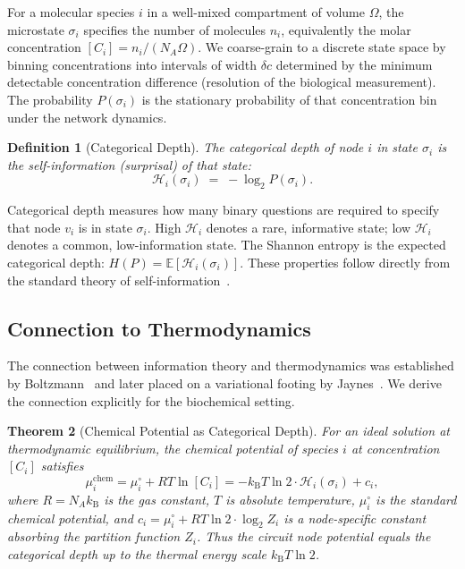 \documentclass[twocolumn,10pt,a4paper]{article}
\newcommand{\kB}{k_{\mathrm{B}}}
\newcommand{\Hcat}{\mathcal{H}}
\newtheorem{theorem}{Theorem}[section]
\newtheorem{definition}[theorem]{Definition}
\begin{document}
For a molecular species $i$ in a well-mixed compartment of volume $\Omega$,
the microstate $\sigma_i$ specifies the number of molecules $n_i$, equivalently
the molar concentration $[C_i]=n_i/(N_A\Omega)$.  We coarse-grain to a discrete
state space by binning concentrations into intervals of width $\delta c$
determined by the minimum detectable concentration difference (resolution of
the biological measurement).  The probability $P(\sigma_i)$ is the stationary
probability of that concentration bin under the network dynamics.

\begin{definition}[Categorical Depth]
\label{def:catdepth}
The \emph{categorical depth} of node $i$ in state $\sigma_i$ is the
self-information (surprisal) of that state:
\begin{equation}
  \Hcat_i(\sigma_i) \;=\; -\log_2 P(\sigma_i).
  \label{eq:catdepth}
\end{equation}
\end{definition}

Categorical depth measures how many binary questions are required to specify
that node $v_i$ is in state $\sigma_i$.  High $\Hcat_i$ denotes a rare,
informative state; low $\Hcat_i$ denotes a common, low-information state.
The Shannon entropy is the expected categorical depth:
$H(P)=\mathbb{E}[\Hcat_i(\sigma_i)]$.  These properties follow directly from
the standard theory of self-information~\cite{CoverThomas2006}.

\subsection{Connection to Thermodynamics}
\label{sec:info-thermo}

The connection between information theory and thermodynamics was established by
Boltzmann~\cite{Boltzmann1877} and later placed on a variational footing by
Jaynes~\cite{Jaynes1957}.  We derive the connection explicitly for the
biochemical setting.

\begin{theorem}[Chemical Potential as Categorical Depth]
\label{thm:mu-catdepth}
For an ideal solution at thermodynamic equilibrium, the chemical potential of
species $i$ at concentration $[C_i]$ satisfies
\begin{equation}
  \mu_i^{\mathrm{chem}} = \mu_i^\circ + RT\ln[C_i]
    = -\kB T\ln 2\cdot\Hcat_i(\sigma_i) + c_i,
  \label{eq:mu-catdepth}
\end{equation}
where $R=N_A\kB$ is the gas constant, $T$ is absolute temperature, $\mu_i^\circ$
is the standard chemical potential, and
$c_i = \mu_i^\circ + RT\ln 2\cdot\log_2 Z_i$ is a node-specific constant
absorbing the partition function $Z_i$.  Thus the circuit node potential equals
the categorical depth up to the thermal energy scale $\kB T\ln 2$.
\end{theorem}
\end{document}
